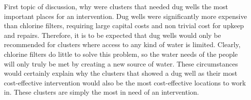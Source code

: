First topic of discussion, why were clusters that needed dug wells the most important places for an intervention. 
Dug wells were significantly more expensive than chlorine filters, requiring large capital costs and non trivial cost for upkeep and repairs. 
Therefore, it is to be expected that dug wells would only be recommended for clusters where access to any kind of water is limited. 
Clearly, chlorine filters do little to solve this problem, so the water needs of the people will only truly be met by creating a new source of water. 
These circumstances would certainly explain why the clusters that showed a dug well as their most cost-effective intervention would also be the most cost-effective locations to work in. These clusters are simply the most in need of an intervention.  


